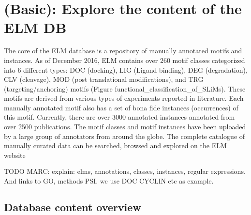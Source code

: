 \section{(Basic): Explore the content of the ELM DB}
\label{sec:explore_content}

The core of the ELM database is a repository of manually annotated motifs and
instances. As of December 2016, ELM contains over 260 motif classes categorized
into 6 different types: DOC (docking), LIG (Ligand binding), DEG (degradation),
CLV (cleavage), MOD (post translational modifications), and TRG
(targeting/anchoring) motifs (Figure functional\_classification\_of\_SLiMs).
These motifs are derived from various types of experiments reported in
literature. Each manually annotated motif also has a set of bona fide instances
(occurrences) of this motif. Currently, there are over 3000 annotated instances
annotated from over 2500 publications. The motif classes and motif instances
have been uploaded by a large group of annotators from around the globe. The
complete catalogue of manually curated data can be searched, browsed and
explored on the ELM website

TODO MARC: explain: elms, annotations, classes, instances, regular expressions. And links to GO, methods PSI. we use DOC CYCLIN etc as example.

%
%
\subsection{Database content overview}
\label{subsec:explore_content_database}

